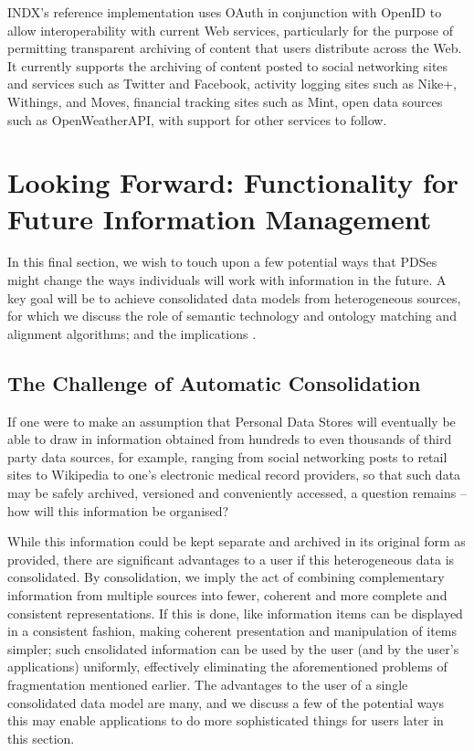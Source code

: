 \documentclass[graybox]{svmult}
\begin{document}
INDX’s reference implementation uses OAuth in conjunction with OpenID to allow interoperability with current Web services, particularly for the purpose of permitting transparent archiving of content that users distribute across the Web.  It currently supports the archiving of content posted to social networking sites and services such as Twitter and Facebook, activity logging sites such as Nike+, Withings, and Moves,  financial tracking sites such as Mint, open data sources such as OpenWeatherAPI, with support for other services to follow.

\section{Looking Forward: Functionality for Future Information Management}

In this final section, we wish to touch upon a few potential ways that PDSes might change the ways individuals will work with information in the future.  A key goal will be to achieve consolidated data models from heterogeneous sources, for which we discuss the role of semantic technology and ontology matching and alignment algorithms; and the implications .

\subsection{The Challenge of Automatic Consolidation}

If one were to make an assumption that Personal Data Stores will eventually be able to draw in information obtained from hundreds to even thousands of third party data sources, for example, ranging from social networking posts to retail sites to Wikipedia to one’s electronic medical record providers, so that such data may be safely archived, versioned and conveniently accessed, a question remains -- how will this information be organised?

While this information could be kept separate and archived in its original form as provided, there are significant advantages to a user if this heterogeneous data is consolidated.  By consolidation, we imply the act of combining complementary information from multiple sources into fewer, coherent and more complete and consistent representations.  If this is done, like information items can be displayed in a consistent fashion, making coherent presentation and manipulation of items simpler; such cnsolidated information can be used by the user (and by the user’s applications) uniformly, effectively eliminating the  aforementioned problems of fragmentation mentioned earlier. The advantages to the user of  a single consolidated data model are many, and we discuss a few of the potential ways this may enable applications to do more sophisticated things for users later in this section.
\end{document}
